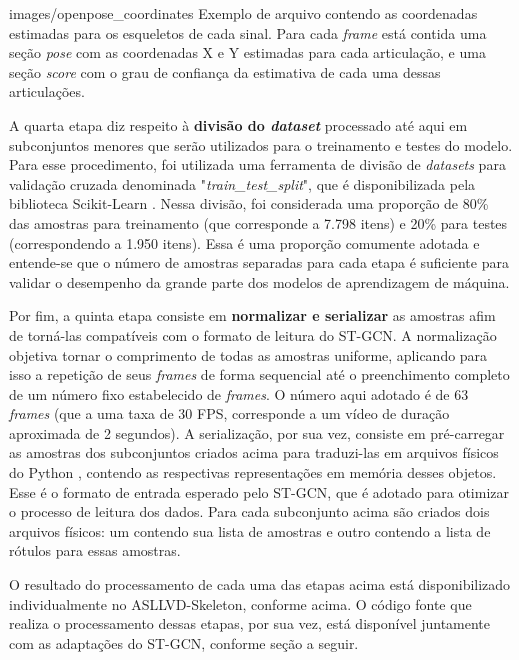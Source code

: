     {images/openpose_coordinates}
    {Exemplo de arquivo contendo as coordenadas estimadas para os esqueletos de cada sinal. Para cada \textit{frame} está contida uma seção \textit{pose} com as coordenadas X e Y estimadas para cada articulação, e uma seção \textit{score} com o grau de confiança da estimativa de cada uma dessas articulações.}

A quarta etapa diz respeito à \textbf{divisão do \textit{dataset}} processado até aqui em subconjuntos menores que serão utilizados para o treinamento e testes do modelo. Para esse procedimento, foi utilizada uma ferramenta de divisão de \textit{datasets} para validação cruzada denominada "\textit{train\_test\_split}", que é disponibilizada pela biblioteca Scikit-Learn \cite{scikit-learn}. Nessa divisão, foi considerada uma proporção de 80\% das amostras para treinamento (que corresponde a 7.798 itens) e 20\% para testes (correspondendo a 1.950 itens). Essa é uma proporção comumente adotada e entende-se que o número de amostras separadas para cada etapa é suficiente para validar o desempenho da grande parte dos modelos de aprendizagem de máquina.

Por fim, a quinta etapa consiste em \textbf{normalizar e serializar} as amostras afim de torná-las compatíveis com o formato de leitura do ST-GCN. A normalização objetiva tornar o comprimento de todas as amostras uniforme, aplicando para isso a repetição de seus \textit{frames} de forma sequencial até o preenchimento completo de um número fixo estabelecido de \textit{frames}. O número aqui adotado é de 63 \textit{frames} (que a uma taxa de 30 FPS, corresponde a um vídeo de duração aproximada de 2 segundos). A serialização, por sua vez, consiste em pré-carregar as amostras dos subconjuntos criados acima para traduzi-las em arquivos físicos do Python \cite{python}, contendo as respectivas representações em memória desses objetos. Esse é o formato de entrada esperado pelo ST-GCN, que é adotado para otimizar o processo de leitura dos dados. Para cada subconjunto acima são criados dois arquivos físicos: um contendo sua lista de amostras e outro contendo a lista de rótulos para essas amostras. 

O resultado do processamento de cada uma das etapas acima está disponibilizado individualmente no ASLLVD-Skeleton, conforme acima. O código fonte que realiza o processamento dessas etapas, por sua vez, está disponível juntamente com as adaptações do ST-GCN, conforme seção a seguir.


